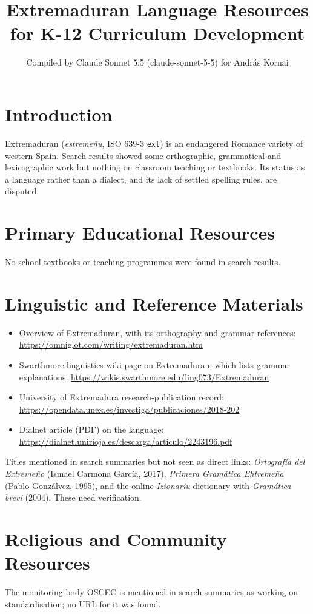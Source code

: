 \documentclass[12pt]{article}
\title{Extremaduran Language Resources for K-12 Curriculum Development}
\author{Compiled by Claude Sonnet 5.5 (claude-sonnet-5-5) for Andr\'as Kornai}
\date{}
\begin{document}
\maketitle

\section{Introduction}
Extremaduran (\emph{estreme\~nu}, ISO 639-3 \texttt{ext}) is an endangered Romance variety of western Spain. Search results showed some orthographic, grammatical and lexicographic work but nothing on classroom teaching or textbooks. Its status as a language rather than a dialect, and its lack of settled spelling rules, are disputed.

\section{Primary Educational Resources}
No school textbooks or teaching programmes were found in search results.

\section{Linguistic and Reference Materials}
\begin{itemize}
\item Overview of Extremaduran, with its orthography and grammar references: \url{https://omniglot.com/writing/extremaduran.htm}
\item Swarthmore linguistics wiki page on Extremaduran, which lists grammar explanations: \url{https://wikis.swarthmore.edu/ling073/Extremaduran}
\item University of Extremadura research-publication record: \url{https://opendata.unex.es/investiga/publicaciones/2018-202}
\item Dialnet article (PDF) on the language: \url{https://dialnet.unirioja.es/descarga/articulo/2243196.pdf}
\end{itemize}
Titles mentioned in search summaries but not seen as direct links: \emph{Ortograf\'ia del Extreme\~no} (Ismael Carmona Garc\'ia, 2017), \emph{Primera Gram\'atica Ehtreme\~na} (Pablo Gonz\'alvez, 1995), and the online \emph{Izionariu} dictionary with \emph{Gram\'atica brevi} (2004). These need verification.

\section{Religious and Community Resources}
The monitoring body OSCEC is mentioned in search summaries as working on standardisation; no URL for it was found.
\end{document}
